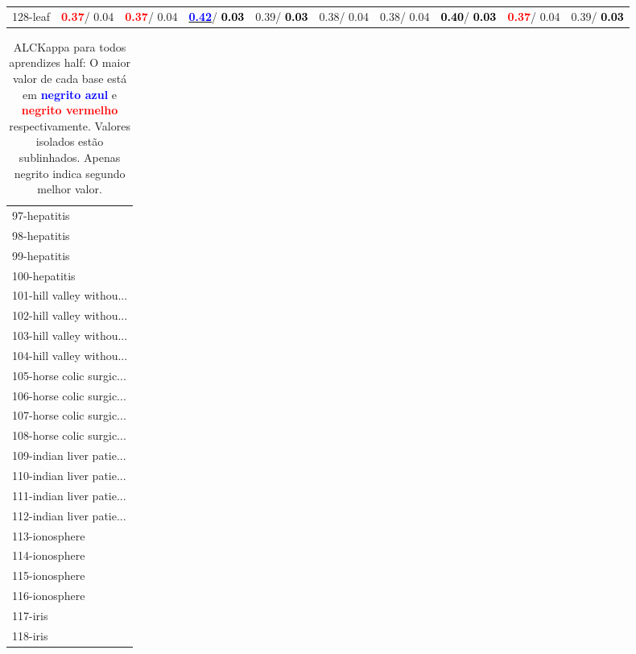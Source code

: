 \begin{table}[h]
\begin{center}
{\begin{tabular}{lc|c|c|c|c|c|c|c|c}
128-leaf & \textcolor{red}{\textbf{  0.37}}/  0.04 & \textcolor{red}{\textbf{  0.37}}/  0.04 & \underline{\textcolor{blue}{\textbf{  0.42}}}/\textcolor{black}{\textbf{  0.03}} &   0.39/\textcolor{black}{\textbf{  0.03}} &   0.38/  0.04 &   0.38/  0.04 & \textcolor{black}{\textbf{  0.40}}/\textcolor{black}{\textbf{  0.03}} & \textcolor{red}{\textbf{  0.37}}/  0.04 &   0.39/\textcolor{black}{\textbf{  0.03}} \\\end{tabular}}\label{stratsALCKappa3AllReduxhalfa}
\end{center}
\end{table}
\begin{table}[h]
\caption{ALCKappa para todos aprendizes half: O maior valor de cada base está em \textcolor{blue}{\textbf{negrito azul}} e \textcolor{red}{\textbf{negrito vermelho}} respectivamente. Valores isolados estão sublinhados. Apenas negrito indica segundo melhor valor.}
\begin{center}\begin{tabular}{l}
 & \\ \hline 97-hepatitis &  \\
98-hepatitis &  \\
99-hepatitis &  \\
100-hepatitis &  \\
101-hill valley withou... &  \\
102-hill valley withou... &  \\
103-hill valley withou... &  \\ \hline
104-hill valley withou... &  \\
105-horse colic surgic... &  \\
106-horse colic surgic... &  \\
107-horse colic surgic... &  \\
108-horse colic surgic... &  \\
109-indian liver patie... &  \\
110-indian liver patie... &  \\ \hline
111-indian liver patie... &  \\
112-indian liver patie... &  \\
113-ionosphere &  \\
114-ionosphere &  \\
115-ionosphere &  \\
116-ionosphere &  \\
117-iris &  \\ \hline
118-iris &  \\

\end{tabular}
\end{center}
\end{table}
